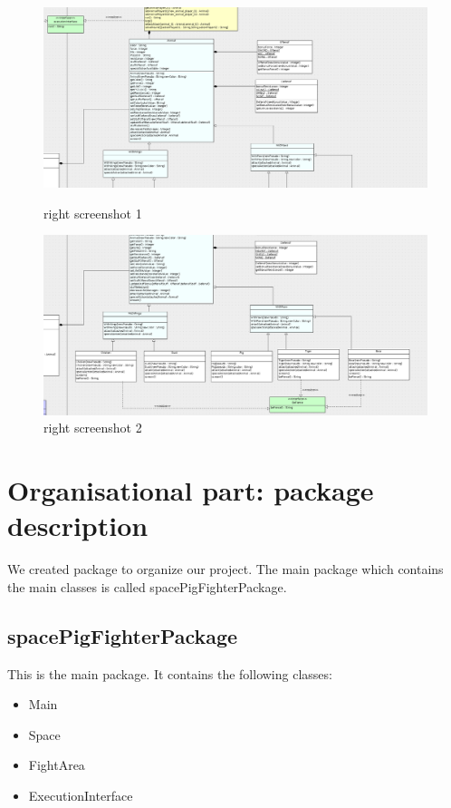 \begin{figure}
  \includegraphics[width=460pt]{../../Images/2_2-3_2-3_3.png}
  \caption{\small right screenshot 1}
  \includegraphics[width=460pt]{../../Images/2_3-3_3.png}
  \caption{\small right screenshot 2}
\end{figure}


\section{Organisational part: package description}

We created package to organize our project. 
The main package which contains the main classes is called spacePigFighterPackage.

\subsection{spacePigFighterPackage}

This is the main package. It contains the following classes:
\begin{itemize}
 \item Main
 \item Space
 \item FightArea
 \item ExecutionInterface
\end{itemize}

